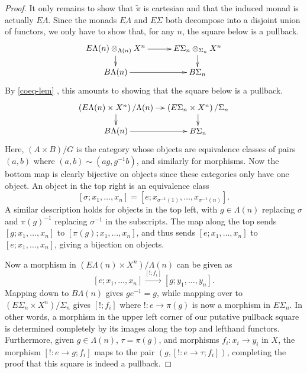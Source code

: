 \begin{proof}
It only remains to show that $\tilde{\pi}$ is cartesian and that the induced monad is actually $\underline{E\Lambda}$. Since the monads $\underline{E\Lambda}$ and $\underline{E\Sigma}$ both decompose into a disjoint union of functors, we only have to show that, for any $n$, the square below is a pullback.
  \[
    \xy
      (0,0)*+{\coeq{E\Lambda}{X}{\Lambda}{n}} ="00";
      (0,-10)*+{B\Lambda(n)} ="01";
      (35,0)*+{E\Sigma_{n} \otimes_{\Sigma_{n}} X^n} ="10";
      (35,-10)*+{B\Sigma_{n}} ="11";
      {\ar^{} "00" ; "10"};
      {\ar^{} "10" ; "11"};
      {\ar^{} "00" ; "01"};
      {\ar^{} "01" ; "11"};
    \endxy
  \]
By \cref{coeq-lem}
, this amounts to showing that the square below is a pullback.
  \[
    \xy
      (0,0)*+{\left(E\Lambda(n) \times X^n\right)/\Lambda(n)} ="00";
      (0,-10)*+{B\Lambda(n)} ="01";
      (35,0)*+{\left(E\Sigma_{n} \times X^n\right)/\Sigma_{n}} ="10";
      (35,-10)*+{B\Sigma_{n}} ="11";
      {\ar^{} "00" ; "10"};
      {\ar^{} "10" ; "11"};
      {\ar^{} "00" ; "01"};
      {\ar^{} "01" ; "11"};
    \endxy
  \]
Here, $(A \times B)/G$ is the category whose objects are equivalence classes of pairs $(a,b)$ where $(a,b) \sim (ag, g^{-1}b)$, and similarly for morphisms. Now the bottom map is clearly bijective on objects since these categories only have one object. An object in the top right is an equivalence class
  \[
    [\sigma; x_{1}, \ldots, x_{n}] = \left[e; x_{\sigma^{-1}(1)}, \ldots, x_{\sigma^{-1}(n)}\right].
  \]
A similar description holds for objects in the top left, with $g \in \Lambda(n)$ replacing $\sigma$ and $\pi(g)^{-1}$ replacing $\sigma^{-1}$ in the subscripts. The map along the top sends $[g; x_{1}, \ldots, x_{n}]$ to $[\pi(g); x_{1}, \ldots, x_{n}]$, and thus sends $[e; x_{1}, \ldots, x_{n}]$ to $[e; x_{1}, \ldots, x_{n}]$, giving a bijection on objects.

Now a morphism in $(E\Lambda(n) \times X^{n})/\Lambda(n)$ can be given as
  \[
    [e; x_{1}, \ldots, x_{n}] \stackrel{[!; f_{i}]}{\longrightarrow} [g; y_{1}, \ldots, y_{n}].
  \]
Mapping down to $B\Lambda(n)$ gives $ge^{-1} = g$, while mapping over to $(E\Sigma_{n} \times X^{n})/\Sigma_{n}$ gives $[!; f_{i}]$ where $! \colon e \rightarrow \pi(g)$ is now a morphism in $E\Sigma_{n}$. In other words, a morphism in the upper left corner of our putative pullback square is determined completely by its images along the top and lefthand functors. Furthermore, given $g \in \Lambda(n)$, $\tau = \pi(g)$, and morphisms $f_{i} \colon x_{i} \rightarrow y_{i}$ in $X$, the morphism $[! \colon e \rightarrow g; f_{i}]$ maps to the pair $(g, [! \colon e \rightarrow \tau; f_{i}])$, completing the proof that this square is indeed a pullback.
\end{proof}

